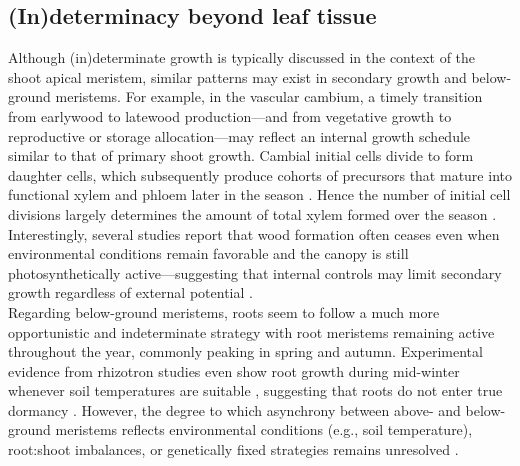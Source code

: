\documentclass{article}
\begin{document}
	\subsection*{(In)determinacy beyond leaf tissue} 
	Although (in)determinate growth is typically discussed in the context of the shoot apical meristem, similar patterns may exist in secondary growth and below-ground meristems. For example, in the vascular cambium, a timely transition from earlywood to latewood production---and from vegetative growth to reproductive or storage allocation---may reflect an internal growth schedule similar to that of primary shoot growth. Cambial initial cells divide to form daughter cells, which subsequently produce cohorts of precursors that mature into functional xylem and phloem later in the season \citep{valdovinos-ayalaSeasonalPatternsIncreases2022}. Hence the number of initial cell divisions largely determines the amount of total xylem formed over the season \citep{lupiXylemPhenologyWood2010}. Interestingly, several studies report that wood formation often ceases even when environmental conditions remain favorable and the canopy is still photosynthetically active—suggesting that internal controls may limit secondary growth regardless of external potential  \citep{buttoComparingCellDynamics2020, arendStemGrowthPhenology2024}.\\
	
	Regarding below-ground meristems, roots seem to follow a much more opportunistic and indeterminate strategy with root meristems remaining active throughout the year, commonly peaking in spring and autumn. Experimental evidence from rhizotron studies even show root growth during mid-winter whenever soil temperatures are suitable  \citep{lyfordControlledGrowthForest1966}, suggesting that roots do not enter true dormancy \citep{radvilleRootPhenologyChanging2016}. However, the degree to which asynchrony between above- and below-ground meristems reflects environmental conditions (e.g., soil temperature), root:shoot imbalances, or genetically fixed strategies remains unresolved \citep{abramoffAreBelowgroundPhenology2015, makotoSynchronousAsynchronousRoot2020}.\\
	
	
	
\end{document}

